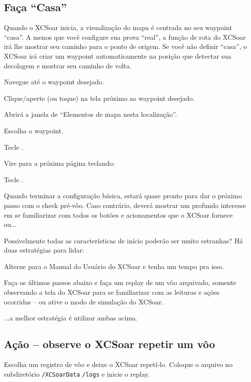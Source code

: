 \documentclass[a4paper,12pt,utf8]{scrreprt}
\begin{document}
\subsection{\textcolor{flashblue}{Faça ``Casa''}}
Quando o XCSoar inicia, a visualização do mapa é centrada no seu waypoint “casa”.  A menos que você configure sua prova “real”, a função de rota do XCSoar irá lhe mostrar seu caminho para o ponto de origem.  Se você não definir “casa”, o XCSoar irá criar um waypoint automaticamente na posição que detectar sua decolagem e mostrar seu caminho de volta.
\begin{compactitem}
\item Navegue até o waypoint desejado.
\item Clique/aperte (ou toque) na tela próximo ao waypoint desejado.
\item Abrirá a janela de “Elementos de mapa nesta localização”.
\item Escolha o waypoint.
\item Tecle .
\item Vire para a próxima página teclando: \blink
\item Tecle .
\end{compactitem}

Quando terminar a configuração básica, estará quase pronto para dar o próximo passo com o check pré-vôo.  Caso contrário, deverá mostrar um profundo interesse em se familiarizar com todos os botões e acionamentos que o XCSoar fornece ou...

Possivelmente todas as características de início poderão ser muito estranhas?  Há duas estratégias para lidar:


\begin{compactitem}
\item Alterne para o Manual do Usuário do XCSoar e tenha um tempo pra isso.
\item Faça os últimos passos abaixo e faça um replay de um vôo arquivado, somente observando a tela do XCSoar para se familiarizar com as leituras e ações ocorridas – ou ative o modo de simulação do XCSoar.
\end{compactitem}

...a melhor estratégia é utilizar ambas acima.

\subsection{\textcolor{flashblue}{Ação – observe o XCSoar repetir um vôo}}
Escolha um registro de vôo e deixe o XCSoar repetí-lo.  Coloque o arquivo no subdiretório \verb+/XCSoarData+ \verb+/logs+ e inicie o replay.
\end{document}

